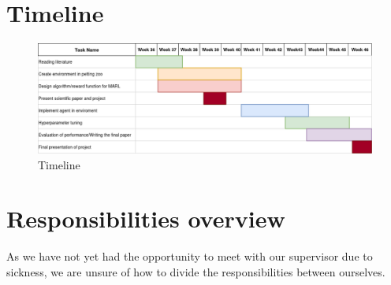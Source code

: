 \documentclass{article}
\begin{document}
\section{Timeline}
\begin{figure}[h]
    \begin{center}
        \includegraphics[width=\textwidth]{Timeline.png}
    \end{center}
    \caption{Timeline}
    \label{fig:timeline}
\end{figure}

\section{Responsibilities overview}
As we have not yet had the opportunity to meet with our supervisor due to sickness, we are unsure of
how to divide the responsibilities between ourselves.


\end{document}
